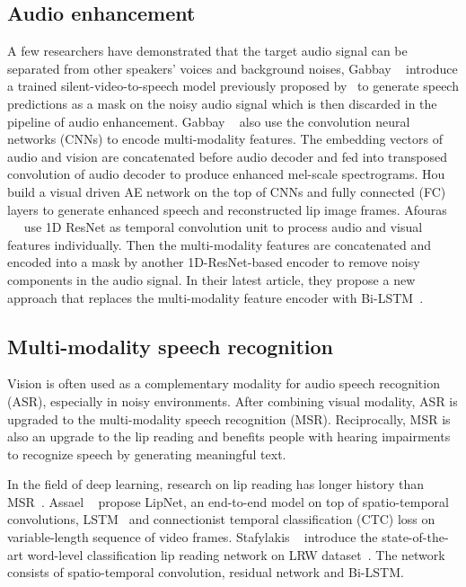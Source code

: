\documentclass[10pt,twocolumn,letterpaper]{article}
\begin{document}
\subsection{Audio enhancement}

A few researchers have demonstrated that the target audio signal can be separated from other speakers' voices and background noises, \eg Gabbay \etal~\cite{gabbay2018seeing} introduce a trained silent-video-to-speech model previously proposed by~\cite{ephrat2017improved} to generate speech predictions as a mask on the noisy audio signal which is then discarded in the pipeline of audio enhancement. Gabbay \etal~\cite{gabbay2017visual} also use the convolution neural networks (CNNs) to encode multi-modality features. The embedding vectors of audio and vision are concatenated before audio decoder and fed into transposed convolution of audio decoder to produce enhanced mel-scale spectrograms. Hou \etal~\cite{hou2018audio} build a visual driven AE network on the top of CNNs and fully connected (FC) layers to generate enhanced speech and reconstructed lip image frames. Afouras ~\etal~\cite{afouras2018conversation} use 1D ResNet as temporal convolution unit to process audio and visual features individually. Then the multi-modality features are concatenated and encoded into a mask by another 1D-ResNet-based encoder to remove noisy components in the audio signal. In their latest article, they propose a new approach that replaces the multi-modality feature encoder with Bi-LSTM~\cite{afouras2019my}.

\subsection{Multi-modality speech recognition}

Vision is often used as a complementary modality for audio speech recognition (ASR), especially in noisy environments. After combining visual modality, ASR is upgraded to the multi-modality speech recognition (MSR). Reciprocally, MSR is also an upgrade to the lip reading and benefits people with hearing impairments to recognize speech by generating meaningful text.

In the field of deep learning, research on lip reading has longer history than MSR~\cite{zhou2014review}. Assael \etal~\cite{assael2016lipnet} propose LipNet, an end-to-end model on top of spatio-temporal convolutions, LSTM~\cite{hochreiter1997long} and connectionist temporal classification (CTC) loss on variable-length sequence of video frames. Stafylakis \etal~\cite{stafylakis2017combining} introduce the state-of-the-art word-level classification lip reading network on LRW dataset~\cite{chung2016lip}. The network consists of spatio-temporal convolution, residual network and Bi-LSTM. 
\end{document}
